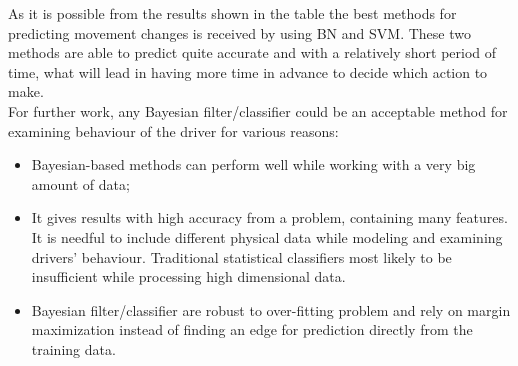 \begin{table}[h]
	\caption{Different Methods Performance Comparison} 
	\centering 
		\label{table:DA}
	\end{table}

As it is possible from the results shown in the table the best methods for predicting movement changes is received by using \gls{BN} and \gls{SVM}. These two methods are able to predict quite accurate and with a relatively short period of time, what will lead in having more time in advance to decide which action to make. \\
For further work, any Bayesian filter/classifier could be an acceptable method for examining behaviour of the driver for various reasons: 

\begin{itemize}
	\item Bayesian-based methods can perform well while working with a very big amount of data;
	\item It gives results with high accuracy from a problem, containing many features. It is needful to include different physical data while modeling and examining drivers’ behaviour. Traditional statistical classifiers most likely to be insufficient while processing high dimensional data.
	\item Bayesian filter/classifier are robust to over-fitting problem and rely on margin maximization instead of finding an edge for prediction directly from the training data.
\end{itemize}

